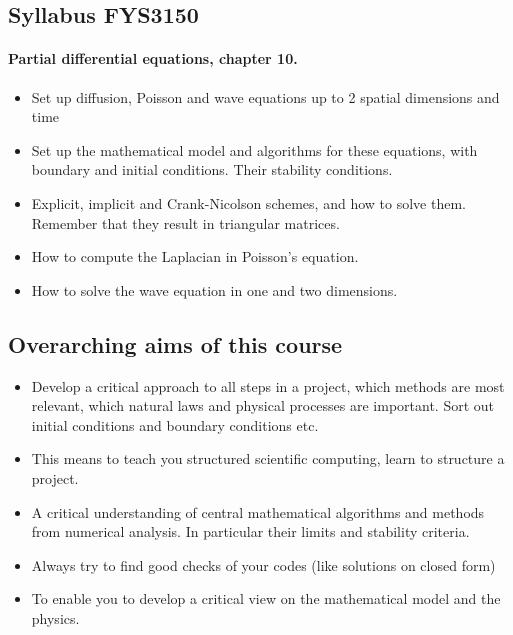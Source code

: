 \documentclass[%
oneside,                 %
final,                   %
10pt]{article}
\begin{document}
\noindent




\subsection*{Syllabus FYS3150}


\paragraph{Partial differential equations, chapter 10.}
\begin{itemize}
  \item Set up diffusion, Poisson and wave equations up to 2 spatial dimensions and time

  \item Set up the mathematical model and algorithms for these equations, with boundary and initial conditions. Their stability conditions.

  \item Explicit, implicit and Crank-Nicolson schemes, and how to solve them. Remember that they result in triangular matrices.

  \item How to compute the Laplacian in Poisson's equation.

  \item How to solve the wave equation in one and two dimensions.
\end{itemize}

\noindent




\subsection*{Overarching aims of this course}

\begin{itemize}
  \item Develop a critical approach to all steps in a project, which methods are most relevant, which natural laws and physical processes are important. Sort out initial conditions and boundary conditions etc.

  \item This means to teach you structured scientific computing, learn to structure a project.

  \item A critical understanding of central mathematical algorithms and methods from numerical analysis. In particular their limits and stability criteria.

  \item Always try to find good checks of your codes (like solutions on closed form)

  \item To enable you to develop a critical view on the mathematical model and the physics.
\end{itemize}
\end{document}
